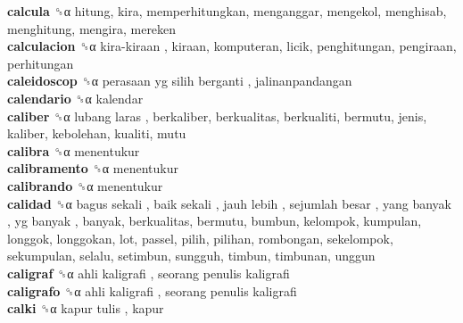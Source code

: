 \textbf{calcula} ␝α  hitung, kira, memperhitungkan, menganggar, mengekol, menghisab, menghitung, mengira, mereken  \\
\textbf{calculacion} ␝α   kira-kiraan , kiraan, komputeran, licik, penghitungan, pengiraan, perhitungan  \\
\textbf{caleidoscop} ␝α   perasaan yg silih berganti , jalinanpandangan  \\
\textbf{calendario} ␝α  kalendar  \\
\textbf{caliber} ␝α   lubang laras , berkaliber, berkualitas, berkualiti, bermutu, jenis, kaliber, kebolehan, kualiti, mutu  \\
\textbf{calibra} ␝α  menentukur  \\
\textbf{calibramento} ␝α  menentukur  \\
\textbf{calibrando} ␝α  menentukur  \\
\textbf{calidad} ␝α   bagus sekali ,  baik sekali ,  jauh lebih ,  sejumlah besar ,  yang banyak ,  yg banyak , banyak, berkualitas, bermutu, bumbun, kelompok, kumpulan, longgok, longgokan, lot, passel, pilih, pilihan, rombongan, sekelompok, sekumpulan, selalu, setimbun, sungguh, timbun, timbunan, unggun  \\
\textbf{caligraf} ␝α   ahli kaligrafi ,  seorang penulis kaligrafi   \\
\textbf{caligrafo} ␝α   ahli kaligrafi ,  seorang penulis kaligrafi   \\
\textbf{calki} ␝α   kapur tulis , kapur  \\
